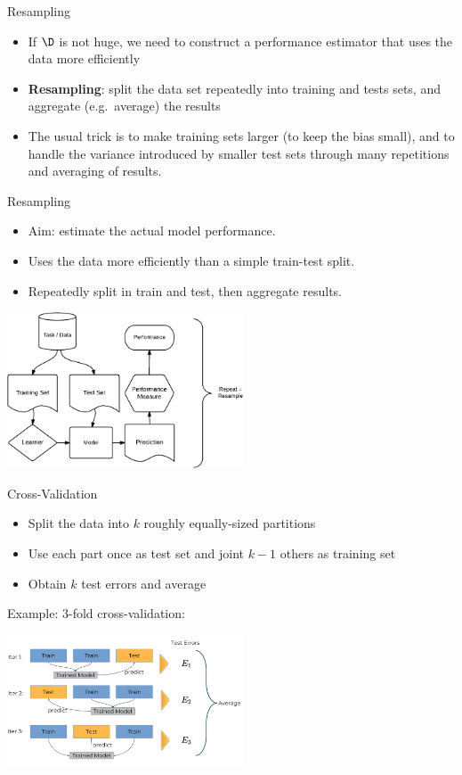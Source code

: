 \begin{frame}{Resampling}
\begin{itemize}
\item  If $\D$ is not huge, we need to construct a performance estimator that uses the data more efficiently
\item \textbf{Resampling}: split the data set repeatedly into training and tests sets, and aggregate (e.g.~average) the results
\item The usual trick is to make training sets larger (to keep the bias small), and to handle the variance introduced by smaller test sets through many repetitions and averaging of results.
\end{itemize}
\end{frame}

\begin{frame}{Resampling}
\begin{itemize}
\item Aim: estimate the actual model performance.
\item Uses the data more efficiently than a simple train-test split.
\item Repeatedly split in train and test, then aggregate results.
\end{itemize}

\begin{center}
\includegraphics[width=7cm]{plots/ml_abstraction-crop.pdf}
\end{center}
\end{frame}



\begin{frame}{Cross-Validation}
\begin{itemize}
\item Split the data into \(k\) roughly equally-sized partitions
\item Use each part once as test set and joint \(k-1\) others as training set
\item Obtain \(k\) test errors and average
\end{itemize}

Example: 3-fold cross-validation:

\begin{center}
\includegraphics[width=7cm]{plots/crossvalidation.png}
\end{center}
\end{frame}


